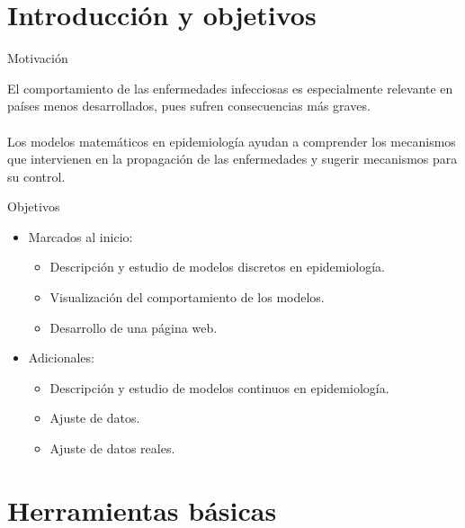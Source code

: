 \section{Introducción y objetivos}


\begin{frame}[c]{Motivación}

    El comportamiento de las enfermedades infecciosas es especialmente relevante en países menos desarrollados, pues sufren consecuencias más graves.
    \\~\\
    Los modelos matemáticos en epidemiología ayudan a comprender los mecanismos que intervienen en la propagación de las enfermedades y sugerir mecanismos para su control.

\end{frame}


\begin{frame}{Objetivos}

    \begin{itemize}
        \item Marcados al inicio:

        \pause
        \begin{itemize}
            \item Descripción y estudio de modelos discretos en epidemiología.
            \pause
            \item Visualización del comportamiento de los modelos.
            \pause
            \item Desarrollo de una página web.
        \end{itemize}
        
        \pause
        \item Adicionales:

        \pause
        \begin{itemize}
            \item Descripción y estudio de modelos continuos en epidemiología.
            \pause
            \item Ajuste de datos.
            \pause
            \item Ajuste de datos reales.
        \end{itemize}
    \end{itemize}

\end{frame}




\section{Herramientas básicas}


